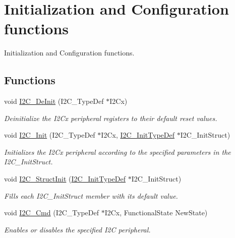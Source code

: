 \hypertarget{group___i2_c___group1}{}\section{Initialization and Configuration functions}
\label{group___i2_c___group1}


Initialization and Configuration functions.  


\subsection*{Functions}
\begin{DoxyCompactItemize}
\item 
void \mbox{\hyperlink{group___i2_c___group1_ga2ee214364603059ad5d9089f749f5bfd}{I2\+C\+\_\+\+De\+Init}} (I2\+C\+\_\+\+Type\+Def $\ast$I2\+Cx)
\begin{DoxyCompactList}\small\item\em Deinitialize the I2\+Cx peripheral registers to their default reset values. \end{DoxyCompactList}\item 
void \mbox{\hyperlink{group___i2_c___group1_gaac29465bca70fbc91c2f922ab67bb88e}{I2\+C\+\_\+\+Init}} (I2\+C\+\_\+\+Type\+Def $\ast$I2\+Cx, \mbox{\hyperlink{struct_i2_c___init_type_def}{I2\+C\+\_\+\+Init\+Type\+Def}} $\ast$I2\+C\+\_\+\+Init\+Struct)
\begin{DoxyCompactList}\small\item\em Initializes the I2\+Cx peripheral according to the specified parameters in the I2\+C\+\_\+\+Init\+Struct. \end{DoxyCompactList}\item 
void \mbox{\hyperlink{group___i2_c___group1_ga08582aca6d7d7910cd5cbff0d9def350}{I2\+C\+\_\+\+Struct\+Init}} (\mbox{\hyperlink{struct_i2_c___init_type_def}{I2\+C\+\_\+\+Init\+Type\+Def}} $\ast$I2\+C\+\_\+\+Init\+Struct)
\begin{DoxyCompactList}\small\item\em Fills each I2\+C\+\_\+\+Init\+Struct member with its default value. \end{DoxyCompactList}\item 
void \mbox{\hyperlink{group___i2_c___group1_ga7e1323c9133c2cb424dfb5b10b7d2f0b}{I2\+C\+\_\+\+Cmd}} (I2\+C\+\_\+\+Type\+Def $\ast$I2\+Cx, Functional\+State New\+State)
\begin{DoxyCompactList}\small\item\em Enables or disables the specified I2C peripheral. \end{DoxyCompactList}\item 

\end{DoxyCompactItemize}
